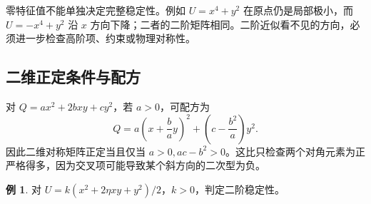 \documentclass[11pt,openany,fontset=fandol]{ctexbook}
\theoremstyle{plain}\newtheorem{theorem}{定理}[chapter]\newtheorem{proposition}[theorem]{命题}
\theoremstyle{definition}\newtheorem{definition}{定义}[chapter]\newtheorem{example}{例}[chapter]
\theoremstyle{remark}\newtheorem*{remark}{说明}
\begin{document}
零特征值不能单独决定完整稳定性。例如 $U=x^4+y^2$ 在原点仍是局部极小，而 $U=-x^4+y^2$ 沿 $x$ 方向下降；二者的二阶矩阵相同。二阶近似看不见的方向，必须进一步检查高阶项、约束或物理对称性。

\subsection{二维正定条件与配方}
对 $Q=ax^2+2bxy+cy^2$，若 $a>0$，可配方为
\begin{equation}
Q=a\left(x+\frac ba y\right)^2+\left(c-\frac{b^2}{a}\right)y^2.
\end{equation}
因此二维对称矩阵正定当且仅当 $a>0,ac-b^2>0$。这比只检查两个对角元素为正严格得多，因为交叉项可能导致某个斜方向的二次型为负。

\begin{example}
对 $U=k(x^2+2\eta xy+y^2)/2$，$k>0$，判定二阶稳定性。
\end{example}

\end{document}
